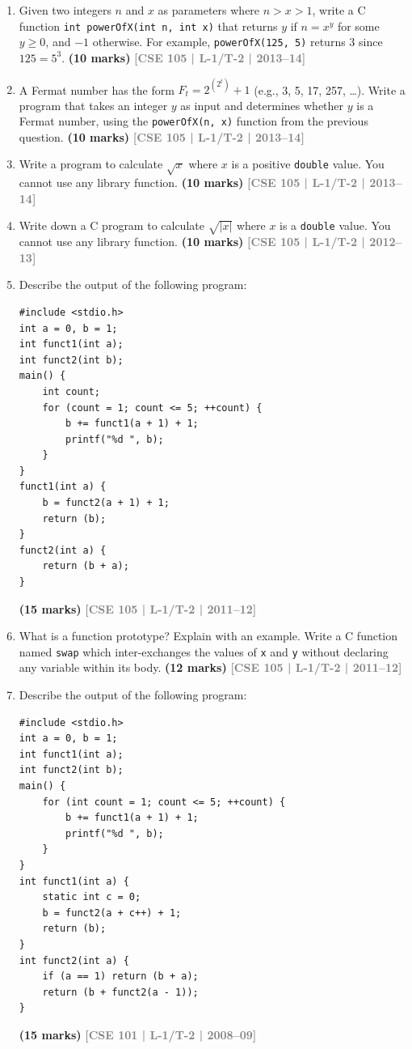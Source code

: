 \documentclass[12pt,a3paper]{article}
\newcommand{\yr}[1]{\hfill\textcolor{gray}{\small\textbf{[#1]}}}
\newcommand{\mk}[1]{\textcolor{orange!70!black}{\small\textbf{(#1 marks)}}}
\begin{document}
\begin{enumerate}
\item Given two integers $n$ and $x$ as parameters where $n > x > 1$, write a C function \texttt{int powerOfX(int n, int x)} that returns $y$ if $n = x^y$ for some $y \ge 0$, and $-1$ otherwise. For example, \texttt{powerOfX(125, 5)} returns 3 since $125 = 5^3$.
\mk{10} \yr{CSE 105 | L-1/T-2 | 2013--14}

\item A Fermat number has the form $F_t = 2^{(2^t)} + 1$ (e.g., 3, 5, 17, 257, \ldots). Write a program that takes an integer $y$ as input and determines whether $y$ is a Fermat number, using the \texttt{powerOfX(n, x)} function from the previous question.
\mk{10} \yr{CSE 105 | L-1/T-2 | 2013--14}

\item Write a program to calculate $\sqrt{x}$ where $x$ is a positive \texttt{double} value. You cannot use any library function.
\mk{10} \yr{CSE 105 | L-1/T-2 | 2013--14}


\item Write down a C program to calculate $\sqrt{\lvert x \rvert}$ where $x$ is a \texttt{double} value. You cannot use any library function.
\mk{10} \yr{CSE 105 | L-1/T-2 | 2012--13}

\item Describe the output of the following program:
 
\begin{lstlisting}
#include <stdio.h>
int a = 0, b = 1;
int funct1(int a);
int funct2(int b);
main() {
    int count;
    for (count = 1; count <= 5; ++count) {
        b += funct1(a + 1) + 1;
        printf("%d ", b);
    }
}
funct1(int a) {
    b = funct2(a + 1) + 1;
    return (b);
}
funct2(int a) {
    return (b + a);
}
\end{lstlisting}
\mk{15} \yr{CSE 105 | L-1/T-2 | 2011--12}

\item What is a function prototype? Explain with an example. Write a C function named \texttt{swap} which inter-exchanges the values of \texttt{x} and \texttt{y} without declaring any variable within its body.
\mk{12} \yr{CSE 105 | L-1/T-2 | 2011--12}

\item Describe the output of the following program:
 
\begin{lstlisting}
#include <stdio.h>
int a = 0, b = 1;
int funct1(int a);
int funct2(int b);
main() {
    for (int count = 1; count <= 5; ++count) {
        b += funct1(a + 1) + 1;
        printf("%d ", b);
    }
}
int funct1(int a) {
    static int c = 0;
    b = funct2(a + c++) + 1;
    return (b);
}
int funct2(int a) {
    if (a == 1) return (b + a);
    return (b + funct2(a - 1));
}
\end{lstlisting}
\mk{15} \yr{CSE 101 | L-1/T-2 | 2008--09}


\end{enumerate}
\end{document}
